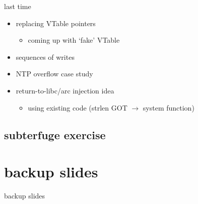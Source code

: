 \date{}
\title{}
\date{}

\begin{frame}
    \titlepage
\end{frame}



\begin{frame}{last time}
    \begin{itemize}
    \item replacing VTable pointers
        \begin{itemize}
        \item coming up with `fake' VTable
        \end{itemize}
    \item sequences of writes
    \item NTP overflow case study
    \item return-to-libc/arc injection idea
        \begin{itemize}
        \item using existing code (strlen GOT $\rightarrow$ system function)
        \end{itemize}
    \end{itemize}
\end{frame}

\subsection{subterfuge exercise}







\section{backup slides}
\begin{frame}{backup slides}
\end{frame}



